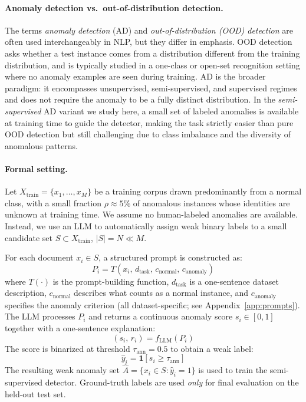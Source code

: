 \documentclass[12pt]{article}
\begin{document}
\paragraph{Anomaly detection vs.\  out-of-distribution detection.}
The terms \textit{anomaly detection} (AD) and \textit{out-of-distribution (OOD) 
detection} are often used interchangeably in NLP, but they differ in emphasis.
OOD detection asks whether a test instance comes from a distribution different 
from the training distribution, and is typically studied in a one-class or 
open-set recognition setting where no anomaly examples are seen during training. 
AD is the broader paradigm: it encompasses unsupervised, semi-supervised, and 
supervised regimes and does not require the anomaly to be a fully distinct 
distribution. In the \textit{semi-supervised} AD variant we study here, a small 
set of labeled anomalies is available at training time to guide the detector, 
making the task strictly easier than pure OOD detection but still challenging 
due to class imbalance and the diversity of anomalous patterns.



\paragraph{Formal setting.}
Let $X_{\text{train}} = \{x_1, \dots, x_M\}$ be a training corpus drawn predominantly
from a normal class, with a small fraction $\rho \approx 5\%$ of anomalous instances
whose identities are unknown at training time. We assume no human-labeled anomalies
are available. Instead, we use an LLM to automatically assign weak binary labels
to a small candidate set $S \subset X_{\text{train}}$, $|S| = N \ll M$.

For each document $x_i \in S$, a structured prompt is constructed as:
\begin{equation}
    P_i = T(x_i,\, d_{\text{task}},\, c_{\text{normal}},\, c_{\text{anomaly}})
\end{equation}
where $T(\cdot)$ is the prompt-building function, $d_{\text{task}}$ is a one-sentence
dataset description, $c_{\text{normal}}$ describes what counts as a normal instance,
and $c_{\text{anomaly}}$ specifies the anomaly criterion (all dataset-specific;
see Appendix~\ref{app:prompts}). The LLM processes $P_i$ and returns a continuous
anomaly score $s_i \in [0,1]$ together with a one-sentence explanation:
\begin{equation}
    (s_i,\, r_i) = f_{\text{LLM}}(P_i)
\end{equation}
The score is binarized at threshold $\tau_{\text{ann}} = 0.5$ to obtain a weak label:
\begin{equation}
    \hat{y}_i = \mathbf{1}[s_i \geq \tau_{\text{ann}}]
\end{equation}
The resulting weak anomaly set
$\hat{A} = \{x_i \in S : \hat{y}_i = 1\}$
is used to train the semi-supervised detector.
Ground-truth labels are used \textit{only} for final evaluation on the held-out test set.
\end{document}
